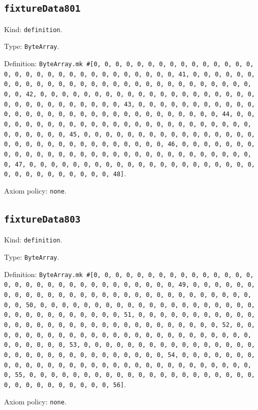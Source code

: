 \documentclass[11pt]{article}
\begin{document}
\subsection*{\texttt{fixtureData801}}
\noindent Kind: \texttt{definition}.\par
\noindent Type: \texttt{ByteArray}.\par
\noindent Definition: \texttt{ByteArray.mk \#[0, 0, 0, 0, 0, 0, 0, 0, 0, 0, 0, 0, 0, 0, 0, 0, 0, 0, 0, 0, 0, 0, 0, 0, 0, 0, 0, 0, 0, 0, 0, 41, 0, 0, 0, 0, 0, 0, 0, 0, 0, 0, 0, 0, 0, 0, 0, 0, 0, 0, 0, 0, 0, 0, 0, 0, 0, 0, 0, 0, 0, 0, 0, 42, 0, 0, 0, 0, 0, 0, 0, 0, 0, 0, 0, 0, 0, 0, 0, 0, 0, 0, 0, 0, 0, 0, 0, 0, 0, 0, 0, 0, 0, 0, 0, 43, 0, 0, 0, 0, 0, 0, 0, 0, 0, 0, 0, 0, 0, 0, 0, 0, 0, 0, 0, 0, 0, 0, 0, 0, 0, 0, 0, 0, 0, 0, 0, 44, 0, 0, 0, 0, 0, 0, 0, 0, 0, 0, 0, 0, 0, 0, 0, 0, 0, 0, 0, 0, 0, 0, 0, 0, 0, 0, 0, 0, 0, 0, 0, 45, 0, 0, 0, 0, 0, 0, 0, 0, 0, 0, 0, 0, 0, 0, 0, 0, 0, 0, 0, 0, 0, 0, 0, 0, 0, 0, 0, 0, 0, 0, 0, 46, 0, 0, 0, 0, 0, 0, 0, 0, 0, 0, 0, 0, 0, 0, 0, 0, 0, 0, 0, 0, 0, 0, 0, 0, 0, 0, 0, 0, 0, 0, 0, 47, 0, 0, 0, 0, 0, 0, 0, 0, 0, 0, 0, 0, 0, 0, 0, 0, 0, 0, 0, 0, 0, 0, 0, 0, 0, 0, 0, 0, 0, 0, 0, 48]}.\par
\noindent Axiom policy: \texttt{none}.\par
\subsection*{\texttt{fixtureData803}}
\noindent Kind: \texttt{definition}.\par
\noindent Type: \texttt{ByteArray}.\par
\noindent Definition: \texttt{ByteArray.mk \#[0, 0, 0, 0, 0, 0, 0, 0, 0, 0, 0, 0, 0, 0, 0, 0, 0, 0, 0, 0, 0, 0, 0, 0, 0, 0, 0, 0, 0, 0, 0, 49, 0, 0, 0, 0, 0, 0, 0, 0, 0, 0, 0, 0, 0, 0, 0, 0, 0, 0, 0, 0, 0, 0, 0, 0, 0, 0, 0, 0, 0, 0, 0, 50, 0, 0, 0, 0, 0, 0, 0, 0, 0, 0, 0, 0, 0, 0, 0, 0, 0, 0, 0, 0, 0, 0, 0, 0, 0, 0, 0, 0, 0, 0, 0, 51, 0, 0, 0, 0, 0, 0, 0, 0, 0, 0, 0, 0, 0, 0, 0, 0, 0, 0, 0, 0, 0, 0, 0, 0, 0, 0, 0, 0, 0, 0, 0, 52, 0, 0, 0, 0, 0, 0, 0, 0, 0, 0, 0, 0, 0, 0, 0, 0, 0, 0, 0, 0, 0, 0, 0, 0, 0, 0, 0, 0, 0, 0, 0, 53, 0, 0, 0, 0, 0, 0, 0, 0, 0, 0, 0, 0, 0, 0, 0, 0, 0, 0, 0, 0, 0, 0, 0, 0, 0, 0, 0, 0, 0, 0, 0, 54, 0, 0, 0, 0, 0, 0, 0, 0, 0, 0, 0, 0, 0, 0, 0, 0, 0, 0, 0, 0, 0, 0, 0, 0, 0, 0, 0, 0, 0, 0, 0, 55, 0, 0, 0, 0, 0, 0, 0, 0, 0, 0, 0, 0, 0, 0, 0, 0, 0, 0, 0, 0, 0, 0, 0, 0, 0, 0, 0, 0, 0, 0, 0, 56]}.\par
\noindent Axiom policy: \texttt{none}.\par
\end{document}
